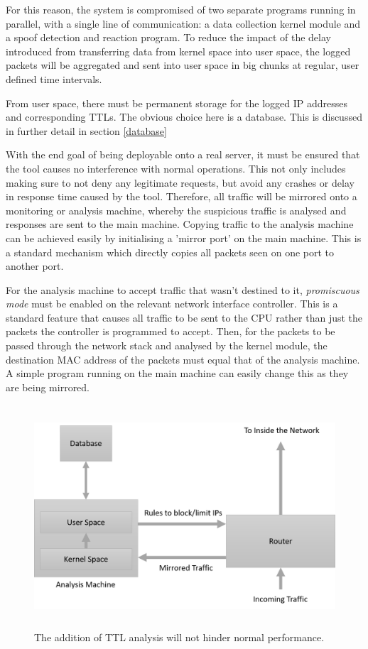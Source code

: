 \documentclass[12pt,twoside]{article}
\begin{document}
For this reason, the system is compromised of two separate programs running in parallel, with a single line of communication: a data collection kernel module and a spoof detection and reaction program. To reduce the impact of the delay introduced from transferring data from kernel space into user space, the logged packets will be aggregated and sent into user space in big chunks at regular, user defined time intervals.

From user space, there must be permanent storage for the logged IP addresses and corresponding TTLs. The obvious choice here is a database. This is discussed in further detail in section \ref{database}

With the end goal of being deployable onto a real server, it must be ensured that the tool causes no interference with normal operations. This not only includes making sure to not deny any legitimate requests, but avoid any crashes or delay in response time caused by the tool. Therefore, all traffic will be mirrored onto a monitoring or analysis machine, whereby the suspicious traffic is analysed and responses are sent to the main machine. Copying traffic to the analysis machine can be achieved easily by initialising a 'mirror port' on the main machine. This is a standard mechanism which directly copies all packets seen on one port to another port.

For the analysis machine to accept traffic that wasn't destined to it, \textit{promiscuous mode} must be enabled on the relevant network interface controller. This is a standard feature that causes all traffic to be sent to the CPU rather than just the packets the controller is programmed to accept. Then, for the packets to be passed through the network stack and analysed by the kernel module, the destination MAC address of the packets must equal that of the analysis machine. A simple program running on the main machine can easily change this as they are being mirrored.

\begin{figure}[h]
	\begin{center}
		\includegraphics[width=13.4cm, height=8.31cm]{figures/system_layout.png}
	\end{center}
	\caption{The addition of TTL analysis will not hinder normal performance.}
	\label{figure_sys_layout} 
\end{figure}
\end{document}
